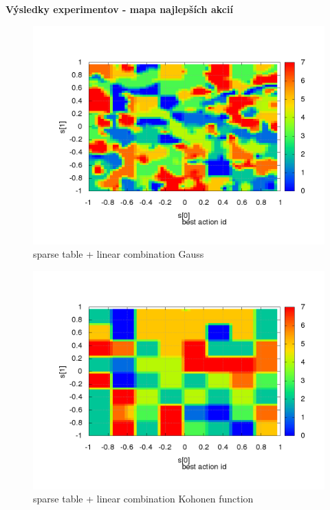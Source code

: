 \documentclass[xcolor=dvipsnames]{beamer}
\begin{document}
\begin{frame}{\bf Výsledky experimentov - mapa najlepších akcií}

\begin{minipage}{.5\textwidth}

\begin{figure}[!htb]
\centering
\includegraphics[scale=.2]{../../results_q_learning/map_1/function_type_3/iterations_10/action_best_value_log_surface.png}
\caption{sparse table + linear combination Gauss}
\end{figure}


\end{minipage}%
\begin{minipage}{.5\textwidth}

\begin{figure}[!htb]
\centering
\includegraphics[scale=.2]{../../results_q_learning/map_1/function_type_4/iterations_10/action_best_value_log_surface.png}
\caption{sparse table + linear combination Kohonen function}
\end{figure}


\end{minipage}
\end{frame}
\end{document}
